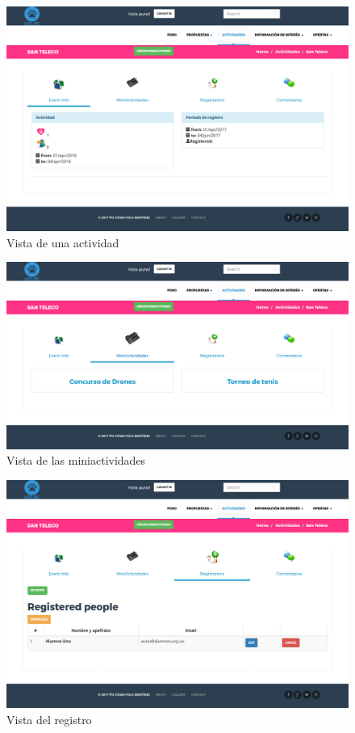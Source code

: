 \begin{figure}[H]
   \centering
   \includegraphics[width=12cm]{img/actividad}
   \caption{Vista de una actividad}
   \label{figura:actividad}
\end{figure}
\begin{figure}[H]
   \centering
   \includegraphics[width=12cm]{img/actividad_miniactividad}
   \caption{Vista de las miniactividades}
   \label{figura:actividad_miniactividad}
\end{figure}
\begin{figure}[H]
   \centering
   \includegraphics[width=12cm]{img/actividad_registro}
   \caption{Vista del registro}
   \label{figura:actividad_registro}
\end{figure}
